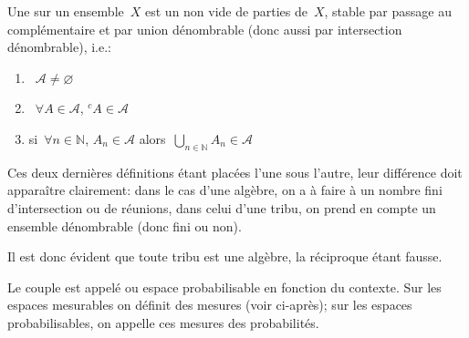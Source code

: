 \medskip
\begin{definition}[Tribu]
Une  sur un ensemble~$X$ est un 
non vide de parties de~$X$, stable par passage au complémentaire et par union dénombrable
(donc aussi par intersection dénombrable), i.e.:
\begin{enumerate}
 \item~$\mathcal{A} \not=\varnothing$
 \item~$\forall A \in \mathcal{A}$, ${}^c A \in\mathcal{A}$%
\item si~$\forall n \in \mathbb{N}$, $A_n \in\mathcal{A}$ alors~$\bigcup_{n\in\mathbb{N}} A_n \in\mathcal{A}$
\end{enumerate}
\end{definition}

Ces deux dernières définitions étant placées l'une sous l'autre, leur différence doit apparaître clairement:
dans le cas d'une algèbre, on a à faire à un nombre fini d'intersection ou de réunions, dans celui
d'une tribu, on prend en compte un ensemble dénombrable (donc fini ou non).

\medskip
Il est donc évident que toute tribu est une algèbre, la réciproque étant fausse.

\begin{definition}
Le couple  est appelé  ou espace probabilisable en fonction du contexte.
Sur les espaces mesurables on définit des mesures (voir ci-après); sur les espaces probabilisables, on
appelle ces mesures des probabilités.
\end{definition}

